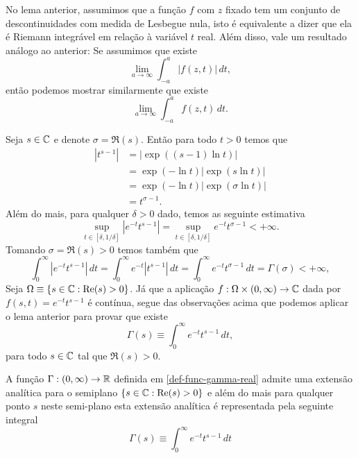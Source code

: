     \begin{observacao}
        No lema anterior, assumimos que a função $f$ com $z$ fixado tem um conjunto de descontinuidades com medida de Lesbegue nula, isto é equivalente a dizer que ela é Riemann integrável 
        em relação à variável $t$ real. Além disso, vale um resultado análogo ao anterior: Se assumimos que existe 
        \[
        \lim_{a \to \infty} \int_{-a}^{a}|f(z,t)| \, dt,
        \]
        então podemos mostrar similarmente que existe
        \[
        \lim_{a \to \infty} \int_{-a}^{a}f(z,t) \, dt.
        \]
    \end{observacao}
    
    
    \bigskip 
    
    
    Seja $s \in \mathbb{C}$ e denote $\sigma = \Re(s)$. Então 
    para todo $t>0$ temos que 
    \begin{align*}
        |t^{s-1}| &= |\exp((s-1)\ln t)| \\
        &= \exp(-\ln{t})|\exp(s\ln t)| \\
        &= \exp(-\ln{t})|\exp(\sigma\ln t)| \\
        &= t^{\sigma - 1}.
    \end{align*}
    Além do mais, para qualquer $\delta>0$ dado,
    temos as seguinte estimativa
    \[
    \sup_{t\in [\delta,1/\delta]} |e^{-t}t^{s-1}|
    =
    \sup_{t\in [\delta,1/\delta]} e^{-t}t^{\sigma-1}
    <+\infty.
    \]
    Tomando $\sigma=\Re(s)>0$ temos também que 
    \begin{equation*}
        \int_{0}^{\infty}|e^{-t}t^{s-1}| \, dt = \int_{0}^{\infty}e^{-t}|t^{s-1}| \, dt = \int_{0}^{\infty}e^{-t}t^{\sigma-1} \, dt 
        = 
        \Gamma(\sigma)<+\infty,
    \end{equation*}
    Seja $\Omega\equiv \{s\in\mathbb{C}: \mathrm{Re}(s)>0\}$. 
    Já que a aplicação $f:\Omega\times (0,\infty)\to\mathbb{C}$ dada por 
    $f(s,t)= e^{-t}t^{s-1}$ é contínua, segue 
    das observações acima que podemos aplicar o lema anterior para 
    provar que existe
    \[
    \Gamma(s)\equiv \int_{0}^{\infty}e^{-t}t^{s-1} \, dt,
    \]
    para todo $s\in\mathbb{C}$ tal que $\Re(s)>0$. 
    \begin{teorema}
        A função $\Gamma:(0,\infty)\to\mathbb{R}$ definida em \eqref{def-func-gamma-real}
        admite uma extensão analítica para o semiplano 
        $\{s \in \mathbb{C} : \mathrm{Re}(s) >0 \}$ e além do mais para qualquer ponto
        $s$ neste semi-plano esta extensão analítica é representada pela
        seguinte integral 
        \[
        \Gamma(s)\equiv \int_{0}^{\infty}e^{-t}t^{s-1} \, dt
        \]
    \end{teorema}
